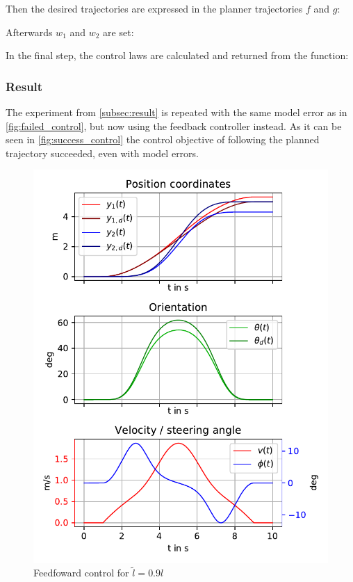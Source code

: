 \documentclass[a4paper,11pt,headings=standardclasses,parskip=half]{scrartcl}
\newcommand{\listcode}[3]{}
\newcommand{\listcodefbcontrol}[2]{\listcode{#1}{#2}{../sim/03_car_feedback_control.py}}
\begin{document}
Then the desired trajectories are expressed in the planner trajectories $f$ and $g$:
\listcodefbcontrol{103}{109}
Afterwards $w_1$ and $w_2$ are set:
\listcodefbcontrol{111}{113}
In the final step, the control laws are calculated and returned from the function:
\listcodefbcontrol{115}{120}
\subsubsection{Result}
The experiment from \ref{subsec:result} is repeated with the same model error as in \autoref{fig:failed_control}, but now using the feedback controller instead. As it can be seen in \autoref{fig:success_control} the control objective of following the planned trajectory succeeded, even with model errors.
\begin{figure}[ht]
\centering
\includegraphics[scale=1]{img/failedcontrol.pdf}
\caption{Feedfoward control for $\tilde{l}=0.9l$}
\label{fig:failed_control}
\end{figure}
\end{document}
